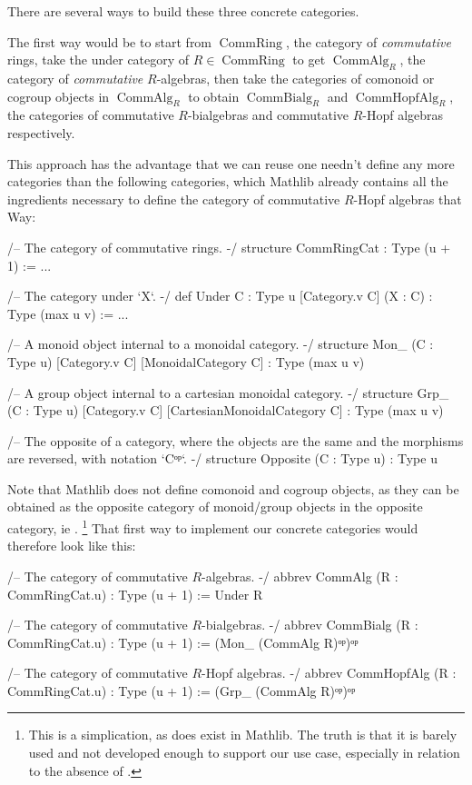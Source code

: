 \documentclass{article}
\DeclareMathOperator{\CommRing}{CommRing}
\DeclareMathOperator{\CommAlg}{CommAlg}
\DeclareMathOperator{\CommBialg}{CommBialg}
\DeclareMathOperator{\CommHopfAlg}{CommHopfAlg}
\begin{document}
There are several ways to build these three concrete categories.

The first way would be to start from $\CommRing$, the category of \emph{commutative} rings, take the under category of $R \in \CommRing$ to get $\CommAlg_R$, the category of \emph{commutative} $R$-algebras,
then take the categories of comonoid or cogroup objects in $\CommAlg_R$ to obtain $\CommBialg_R$ and $\CommHopfAlg_R$, the categories of commutative $R$-bialgebras and commutative $R$-Hopf algebras respectively.

This approach has the advantage that we can reuse one needn't define any more categories than the following categories, which Mathlib already contains all the ingredients necessary to define the category of commutative $R$-Hopf algebras that Way:

\begin{leancode}
  /-- The category of commutative rings. -/
  structure CommRingCat : Type (u + 1) := ...

  /-- The category under `X`. -/
  def Under {C : Type u} [Category.{v} C] (X : C) : Type (max u v) := ...

  /-- A monoid object internal to a monoidal category. -/
  structure Mon_ (C : Type u) [Category.{v} C] [MonoidalCategory C] : Type (max u v)

  /-- A group object internal to a cartesian monoidal category. -/
  structure Grp_ (C : Type u) [Category.{v} C] [CartesianMonoidalCategory C] : Type (max u v)

  /-- The opposite of a category, where the objects are the same and the morphisms are
  reversed, with notation `Cᵒᵖ`. -/
  structure Opposite (C : Type u) : Type u
\end{leancode}

Note that Mathlib does not define comonoid and cogroup objects, as they can be obtained as the opposite category of monoid/group objects in the opposite category, ie .
\footnote{This is a simplication, as  does exist in Mathlib.
The truth is that it is barely used and not developed enough to support our use case, especially in relation to the absence of .}
That first way to implement our concrete categories would therefore look like this:
\begin{leancode}
  /-- The category of commutative $R$-algebras. -/
  abbrev CommAlg (R : CommRingCat.{u}) : Type (u + 1) := Under R

  /-- The category of commutative $R$-bialgebras. -/
  abbrev CommBialg (R : CommRingCat.{u}) : Type (u + 1) := (Mon_ (CommAlg R)ᵒᵖ)ᵒᵖ

  /-- The category of commutative $R$-Hopf algebras. -/
  abbrev CommHopfAlg (R : CommRingCat.{u}) : Type (u + 1) := (Grp_ (CommAlg R)ᵒᵖ)ᵒᵖ
\end{leancode}
\end{document}

